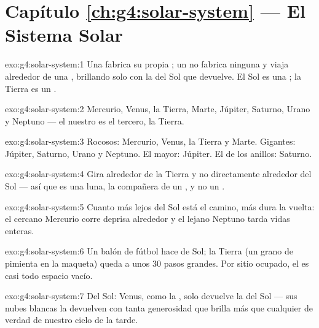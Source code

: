 \section*{Capítulo \ref{ch:g4:solar-system} --- El Sistema Solar}

\begin{solution}{exo:g4:solar-system:1}
Una  fabrica su propia ; un  no fabrica
ninguna y viaja alrededor de una , brillando solo con la 
del Sol que devuelve. El Sol es una ; la Tierra es un
.
\end{solution}

\begin{solution}{exo:g4:solar-system:2}
Mercurio, Venus, la Tierra, Marte, Júpiter, Saturno, Urano y Neptuno
--- el nuestro es el tercero, la Tierra.
\end{solution}

\begin{solution}{exo:g4:solar-system:3}
Rocosos: Mercurio, Venus, la Tierra y Marte. Gigantes: Júpiter,
Saturno, Urano y Neptuno. El mayor: Júpiter. El de los anillos:
Saturno.
\end{solution}

\begin{solution}{exo:g4:solar-system:4}
Gira alrededor de la Tierra y no directamente alrededor del Sol ---
así que es una luna, la compañera de un , y no un .
\end{solution}

\begin{solution}{exo:g4:solar-system:5}
Cuanto más lejos del Sol está el camino, más dura la vuelta: el
cercano Mercurio corre deprisa alrededor y el lejano Neptuno tarda
vidas enteras.
\end{solution}

\begin{solution}{exo:g4:solar-system:6}
Un balón de fútbol hace de Sol; la Tierra (un grano de pimienta en la
maqueta) queda a unos $30$ pasos grandes. Por sitio ocupado, el
 es casi todo espacio vacío.
\end{solution}

\begin{solution}{exo:g4:solar-system:7}
Del Sol: Venus, como la , solo devuelve la  del Sol --- sus
nubes blancas la devuelven con tanta generosidad que brilla más que
cualquier  de verdad de nuestro cielo de la tarde.
\end{solution}

